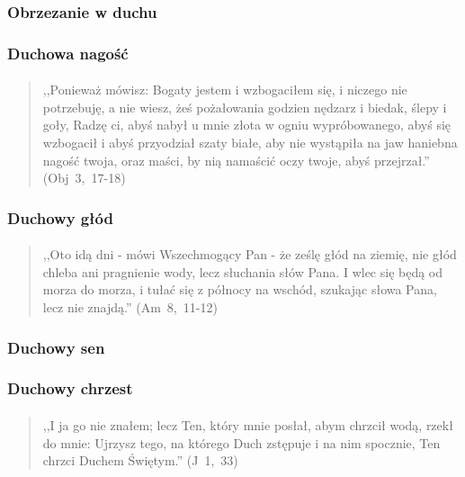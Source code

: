 \documentclass[10pt,a4paper,oneside]{article}
\begin{document}
\subsubsection{Obrzezanie w duchu}
\subsubsection{Duchowa nagość}
\paragraph{}
\begin{quote}
,,Ponieważ mówisz: Bogaty jestem i wzbogaciłem się, i niczego nie potrzebuję, a nie wiesz, żeś pożałowania godzien nędzarz i biedak, ślepy i goły, Radzę ci, abyś nabył u mnie złota w ogniu wypróbowanego, abyś się wzbogacił i abyś przyodział szaty białe, aby nie wystąpiła na jaw haniebna nagość twoja, oraz maści, by nią namaścić oczy twoje, abyś przejrzał.'' \mbox{(Obj 3, 17-18)}
\end{quote}
\subsubsection{Duchowy głód}
\paragraph{}
\begin{quote}
,,Oto idą dni - mówi Wszechmogący Pan - że ześlę głód na ziemię, nie głód chleba ani pragnienie wody, lecz słuchania słów Pana. I wlec się będą od morza do morza, i tułać się z północy na wschód, szukając słowa Pana, lecz nie znajdą.'' \mbox{(Am 8, 11-12)}
\end{quote}
\subsubsection{Duchowy sen}
\subsubsection{Duchowy chrzest}
\paragraph{}
\begin{quote}
,,I ja go nie znałem; lecz Ten, który mnie posłał, abym chrzcił wodą, rzekł do mnie: Ujrzysz tego, na którego Duch zstępuje i na nim spocznie, Ten chrzci Duchem Świętym.'' \mbox{(J 1, 33)}
\end{quote}
\end{document}
